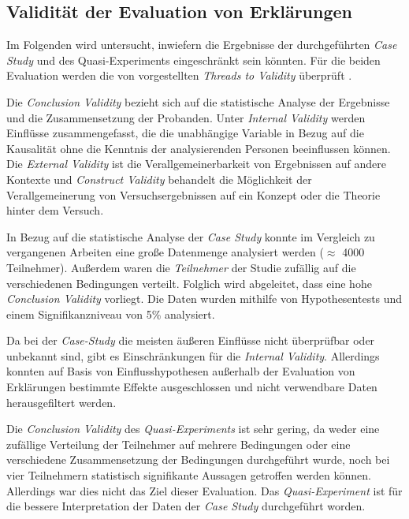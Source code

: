 \subsection{Validität der Evaluation von Erklärungen}

Im Folgenden wird untersucht, inwiefern die Ergebnisse der durchgeführten \textit{Case Study} und des Quasi-Experiments eingeschränkt sein könnten. Für die beiden Evaluation werden die von \citeauthor{wohlin2012experimentation} vorgestellten \textit{Threads to Validity} überprüft \cite{wohlin2012experimentation}.

\newpage

Die \textit{Conclusion Validity} bezieht sich auf die statistische Analyse der Ergebnisse und die Zusammensetzung der Probanden. Unter \textit{Internal Validity} werden Einflüsse zusammengefasst, die die unabhängige Variable in Bezug auf die Kausalität ohne die Kenntnis der analysierenden Personen beeinflussen können. Die \textit{External Validity} ist die Verallgemeinerbarkeit von Ergebnissen auf andere Kontexte und \textit{Construct Validity} behandelt die Möglichkeit der Verallgemeinerung von Versuchsergebnissen auf ein Konzept oder die Theorie hinter dem Versuch.

In Bezug auf die statistische Analyse der \textit{Case Study} konnte im Vergleich zu vergangenen Arbeiten eine große Datenmenge analysiert werden ($\approx$ 4000 Teilnehmer). Außerdem waren die \textit{Teilnehmer} der Studie zufällig auf die verschiedenen Bedingungen verteilt. Folglich wird abgeleitet, dass eine hohe \textit{Conclusion Validity} vorliegt. Die Daten wurden mithilfe von Hypothesentests und einem Signifikanzniveau von 5\% analysiert.

Da bei der \textit{Case-Study} die meisten äußeren Einflüsse nicht überprüfbar oder unbekannt sind, gibt es Einschränkungen für die \textit{Internal Validity}. Allerdings konnten auf Basis von Einflusshypothesen außerhalb der Evaluation von Erklärungen bestimmte Effekte ausgeschlossen und nicht verwendbare Daten herausgefiltert werden.

\smallskip

Die \textit{Conclusion Validity} des \textit{Quasi-Experiments} ist sehr gering, da weder eine zufällige Verteilung der Teilnehmer auf mehrere Bedingungen oder eine verschiedene Zusammensetzung der Bedingungen durchgeführt wurde, noch bei vier Teilnehmern statistisch signifikante Aussagen getroffen werden können. Allerdings war dies nicht das Ziel dieser Evaluation. Das \textit{Quasi-Experiment} ist für die bessere Interpretation der Daten der \textit{Case Study} durchgeführt worden.


